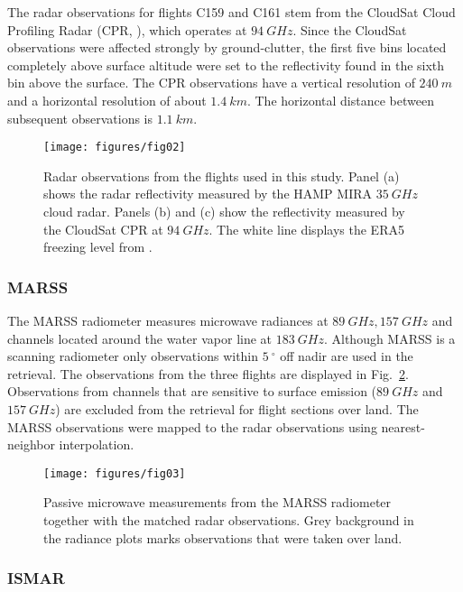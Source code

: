 \documentclass[journal abbreviation, manuscript]{copernicus}
\begin{document}
The radar observations for flights C159 and C161 stem from the CloudSat Cloud
Profiling Radar (CPR, \citet{tanelli08}), which operates at $94\ \unit{GHz}$.
Since the CloudSat observations were affected strongly by ground-clutter, the
first five bins located completely above surface altitude were set to the
reflectivity found in the sixth bin above the surface. The CPR observations
have a vertical resolution of $240\ \unit{m}$ and a horizontal resolution of
about $1.4\ \unit{km}$. The horizontal distance between subsequent observations is
$1.1\ \unit{km}$.

\begin{figure}[hbpt!]
  \centering
  \texttt{[image: figures/fig02]}
  \caption{Radar observations from the flights used in this study. Panel (a)
    shows the radar reflectivity measured by the HAMP MIRA $35\ \unit{GHz}$
    cloud radar. Panels (b) and (c) show the reflectivity measured by the
    CloudSat CPR at $94\ \unit{GHz}$. The white line displays the ERA5 freezing
    level from \citet{era5}. }
  \label{fig:observations_radar}
\end{figure}

\subsubsection{MARSS}

The MARSS radiometer measures microwave radiances at $89\ \unit{GHz},
157\ \unit{GHz}$ and channels located around the water vapor line at $183
\ \unit{GHz}$. Although MARSS is a scanning radiometer only observations within
$5\ \unit{^\circ}$ off nadir are used in the retrieval. The observations from
the three flights are displayed in Fig.~\ref{fig:observations_marss}.
Observations from channels that are sensitive to surface emission
($89\ \unit{GHz}$ and $157\ \unit{GHz}$) are excluded from the retrieval for
flight sections over land. The MARSS observations were mapped to the radar
observations using nearest-neighbor interpolation.

\begin{figure}[h!]
  \centering
  \texttt{[image: figures/fig03]}
  \caption{
    Passive microwave measurements from the MARSS radiometer together with the
    matched radar observations. Grey background in the radiance plots marks
    observations that were taken over land.
    }
  \label{fig:observations_marss}
\end{figure}


\subsubsection{ISMAR}
\end{document}
